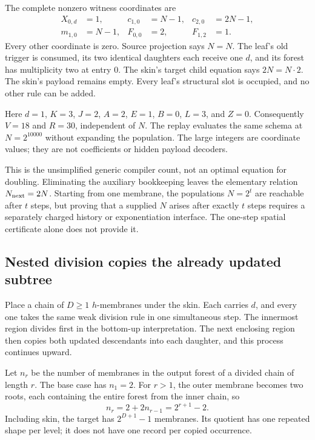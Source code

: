 \documentclass[11pt,letterpaper]{article}
\theoremstyle{definition}
\theoremstyle{remark}
\begin{document}
The complete nonzero witness coordinates are
\begin{align*}
 X_{0,d}&=1,& c_{1,0}&=N-1,&c_{2,0}&=2N-1,\\
 m_{1,0}&=N-1,&F_{0,0}&=2,&F_{1,2}&=1.
\end{align*}
Every other coordinate is zero. Source projection says $N=N$. The leaf's old trigger is consumed, its two identical daughters each receive one $d$, and its forest has multiplicity two at entry 0. The skin's target child equation says $2N=N\cdot2$. The skin's payload remains empty. Every leaf's structural slot is occupied, and no other rule can be added.

Here $d=1$, $K=3$, $J=2$, $A=2$, $E=1$, $B=0$, $L=3$, and $Z=0$. Consequently $V=18$ and $R=30$, independent of $N$. The replay evaluates the same schema at $N=2^{10000}$ without expanding the population. The large integers are coordinate values; they are not coefficients or hidden payload decoders.

This is the unsimplified generic compiler count, not an optimal equation for doubling. Eliminating the auxiliary bookkeeping leaves the elementary relation $N_{\rm next}=2N$. Starting from one membrane, the populations $N=2^t$ are reachable after $t$ steps, but proving that a supplied $N$ arises after exactly $t$ steps requires a separately charged history or exponentiation interface. The one-step spatial certificate alone does not provide it.

\subsection{Nested division copies the already updated subtree}\label{qoc:mm:sec:nested}
Place a chain of $D\geq1$ $h$-membranes under the skin. Each carries $d$, and every one takes the same weak division rule in one simultaneous step. The innermost region divides first in the bottom-up interpretation. The next enclosing region then copies both updated descendants into each daughter, and this process continues upward.

Let $n_r$ be the number of membranes in the output forest of a divided chain of length $r$. The base case has $n_1=2$. For $r>1$, the outer membrane becomes two roots, each containing the entire forest from the inner chain, so
\[
 n_r=2+2n_{r-1}=2^{r+1}-2.
\]
Including skin, the target has $2^{D+1}-1$ membranes. Its quotient has one repeated shape per level; it does not have one record per copied occurrence.
\end{document}
